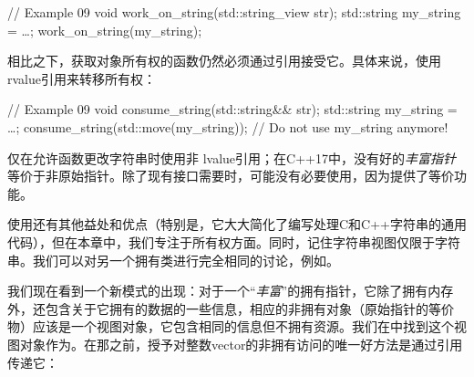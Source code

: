\begin{code}
// Example 09
void work_on_string(std::string_view str);
std::string my_string = …;
work_on_string(my_string);
\end{code}

相比之下，获取对象所有权的函数仍然必须通过引用接受它。具体来说，使用rvalue引用来转移所有权：

\begin{code}
// Example 09
void consume_string(std::string&& str);
std::string my_string = …;
consume_string(std::move(my_string));
// Do not use my_string anymore!
\end{code}

仅在允许函数更改字符串时使用非 lvalue引用；在C++17中，没有好的\emph{丰富指针}等价于非原始指针。除了现有接口需要时，可能没有必要使用，因为提供了等价功能。

使用还有其他益处和优点（特别是，它大大简化了编写处理C和C++字符串的通用代码），但在本章中，我们专注于所有权方面。同时，记住字符串视图仅限于字符串。我们可以对另一个拥有类进行完全相同的讨论，例如。

我们现在看到一个新模式的出现：对于一个“\emph{丰富}”的拥有指针，它除了拥有内存外，还包含关于它拥有的数据的一些信息，相应的非拥有对象（原始指针的等价物）应该是一个视图对象，它包含相同的信息但不拥有资源。我们在\cpp[20] 中找到这个视图对象作为。在那之前，授予对整数vector的非拥有访问的唯一好方法是通过引用传递它：

